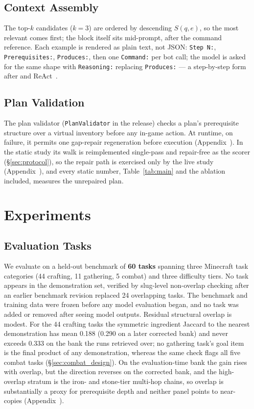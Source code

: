 \documentclass[letterpaper]{article} %
\newcommand{\secref}[1]{\S\ref{#1}}
\newcommand{\appref}[1]{Appendix~\getrefnumber{#1}}
\begin{document}
\subsection{Context Assembly}
\label{sec:context}

The top-$k$ candidates ($k{=}3$) are ordered by descending $S(q,e)$,
so the most relevant comes first; the block itself sits mid-prompt,
after the command reference.  Each example is rendered as plain
text, not JSON: \texttt{Step N:}, \texttt{Prerequisites:},
\texttt{Produces:}, then one \texttt{Command:} per bot call; the model is
asked for the same shape with \texttt{Reasoning:} replacing
\texttt{Produces:} --- a step-by-step form after \citet{wei2022chain} and
ReAct~\citep{yao2023react}.

\subsection{Plan Validation}
\label{sec:planval}

The plan validator (\texttt{PlanValidator} in the release) checks a plan's
prerequisite structure over a virtual inventory before any in-game action.
At runtime, on failure, it permits one gap-repair regeneration before
execution (\appref{app:pseudocode}).  In the static study its walk is
reimplemented single-pass and repair-free as the scorer
(\secref{sec:protocol}), so the repair path is exercised only by the live study
(\appref{sec:live}), and every static number, Table~\ref{tab:main} and the
ablation included, measures the unrepaired plan.

\section{Experiments}

\subsection{Evaluation Tasks}
\label{sec:tasks}

We evaluate on a held-out benchmark of \textbf{60 tasks} spanning three
Minecraft task categories (44 crafting, 11 gathering, 5 combat) and
three difficulty tiers.  No task appears in the demonstration set, verified
by slug-level non-overlap checking after an earlier benchmark revision replaced
24 overlapping tasks.  The benchmark and training data were frozen before any
model evaluation began, and no task was added or removed after seeing model
outputs.  Residual structural overlap is modest.  For the 44
crafting tasks the symmetric ingredient Jaccard to the nearest demonstration
has mean 0.188 (0.290 on a later corrected bank) and never exceeds 0.333 on
the bank the runs retrieved over; no gathering task's goal item is the final
product of any demonstration, whereas the same check flags all five combat
tasks (\secref{sec:combat_design}).  On the evaluation-time bank the gain
rises with overlap, but the direction reverses on the corrected bank, and the
high-overlap stratum is the iron- and stone-tier multi-hop chains, so overlap
is substantially a proxy for prerequisite depth and neither panel points to
near-copies (\appref{app:overlap}).
\end{document}
